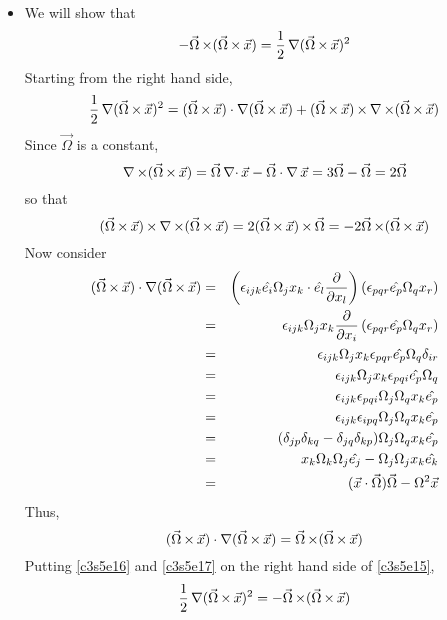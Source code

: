 \begin{itemize}
\item We will show that
\begin{equation}\label{c3s5e14}
-\vec{\Omega}\operatorname{\times}(\vec{\Omega}\operatorname{\times}\vec{x}) = \frac{1}{2}\operatorname{\nabla}(\vec{\Omega}\operatorname{\times}\vec{x})^2
\end{equation}
Starting from the right hand side,
\begin{equation}\label{c3s5e15}
\frac{1}{2}\operatorname{\nabla}(\vec{\Omega}\operatorname{\times}\vec{x})^2 = (\vec{\Omega}\operatorname{\times}\vec{x})\cdot\operatorname{\nabla}(\vec{\Omega}\operatorname{\times}\vec{x}) + (\vec{\Omega}\operatorname{\times}\vec{x})\operatorname{\times}\operatorname{\nabla\operatorname{\times}}(\vec{\Omega}\operatorname{\times}\vec{x})
\end{equation}
Since $\vec{\Omega}$ is a constant,
\[
\operatorname{\nabla\operatorname{\times}}(\vec{\Omega}\operatorname{\times}\vec{x}) = \vec{\Omega}\operatorname{\nabla\cdot}\vec{x} - \vec{\Omega}\cdot\operatorname{\nabla}\vec{x} = 3\vec{\Omega} - \vec{\Omega} = 2\vec{\Omega}
\]
so that
\begin{equation}\label{c3s5e16}
(\vec{\Omega}\operatorname{\times}\vec{x})\operatorname{\times}\operatorname{\nabla\operatorname{\times}}(\vec{\Omega}\operatorname{\times}\vec{x}) = 2(\vec{\Omega}\operatorname{\times}\vec{x})\operatorname{\times}\vec{\Omega} = -2\vec{\Omega}\operatorname{\times}(\vec{\Omega}\operatorname{\times}\vec{x})
\end{equation}
Now consider
\begin{eqnarray*}
(\vec{\Omega}\operatorname{\times}\vec{x})\cdot\operatorname{\nabla}(\vec{\Omega}\operatorname{\times}\vec{x}) &=& 
\left(\epsilon_{ijk}\hat{e_{i}}\Omega_j x_k \cdot \hat{e_{l}}\frac{\partial}{\partial x_l}\right)\left(\epsilon_{pqr}\hat{e_{p}}\Omega_q x_r\right) \\
 &=& \epsilon_{ijk}\Omega_j x_k\frac{\partial}{\partial x_i}\left(\epsilon_{pqr}\hat{e_{p}}\Omega_q x_r\right) \\
 &=& \epsilon_{ijk}\Omega_j x_k \epsilon_{pqr}\hat{e_{p}}\Omega_q \delta_{ir} \\
 &=& \epsilon_{ijk}\Omega_j x_k \epsilon_{pqi}\hat{e_{p}}\Omega_q \\
 &=& \epsilon_{ijk}\epsilon_{pqi} \Omega_j\Omega_q x_k\hat{e_{p}} \\
 &=& \epsilon_{ijk}\epsilon_{ipq} \Omega_j\Omega_q x_k\hat{e_{p}} \\
 &=& (\delta_{jp}\delta_{kq} - \delta_{jq}\delta_{kp})\Omega_j\Omega_q x_k\hat{e_{p}} \\
 &=& x_k\Omega_k \Omega_j\hat{e_{j}} - \Omega_j\Omega_j x_k\hat{e_{k}} \\
 &=& (\vec{x}\cdot\vec{\Omega})\vec{\Omega} - \Omega^2\vec{x} 
\end{eqnarray*}
Thus,
\begin{equation}\label{c3s5e17}
(\vec{\Omega}\operatorname{\times}\vec{x})\cdot\operatorname{\nabla}(\vec{\Omega}\operatorname{\times}\vec{x}) = \vec{\Omega}\operatorname{\times}(\vec{\Omega}\operatorname{\times}\vec{x})
\end{equation}
Putting \eqref{c3s5e16} and \eqref{c3s5e17} on the right hand side of \eqref{c3s5e15},
\[
\frac{1}{2}\operatorname{\nabla}(\vec{\Omega}\operatorname{\times}\vec{x})^2 = -\vec{\Omega}\operatorname{\times}(\vec{\Omega}\operatorname{\times}\vec{x})
\]
\end{itemize}

